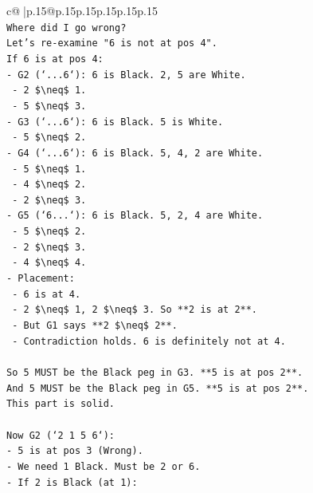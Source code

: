 \documentclass{article}
\begin{document}
{\begin{supertabular}{c@{$\;$}|p{.15\linewidth}@{}p{.15\linewidth}p{.15\linewidth}p{.15\linewidth}p{.15\linewidth}p{.15\linewidth}}
{{{\\ 
\texttt{Where did I go wrong?} \\
\texttt{Let's re{-}examine "6 is not at pos 4".} \\
\texttt{If 6 is at pos 4:} \\
\texttt{{-} G2 (`...6`): 6 is Black. 2, 5 are White.} \\
\texttt{  {-} 2 \$\textbackslash{}neq\$ 1.} \\
\texttt{  {-} 5 \$\textbackslash{}neq\$ 3.} \\
\texttt{{-} G3 (`...6`): 6 is Black. 5 is White.} \\
\texttt{  {-} 5 \$\textbackslash{}neq\$ 2.} \\
\texttt{{-} G4 (`...6`): 6 is Black. 5, 4, 2 are White.} \\
\texttt{  {-} 5 \$\textbackslash{}neq\$ 1.} \\
\texttt{  {-} 4 \$\textbackslash{}neq\$ 2.} \\
\texttt{  {-} 2 \$\textbackslash{}neq\$ 3.} \\
\texttt{{-} G5 (`6...`): 6 is Black. 5, 2, 4 are White.} \\
\texttt{  {-} 5 \$\textbackslash{}neq\$ 2.} \\
\texttt{  {-} 2 \$\textbackslash{}neq\$ 3.} \\
\texttt{  {-} 4 \$\textbackslash{}neq\$ 4.} \\
\texttt{{-} Placement:} \\
\texttt{  {-} 6 is at 4.} \\
\texttt{  {-} 2 \$\textbackslash{}neq\$ 1, 2 \$\textbackslash{}neq\$ 3. So **2 is at 2**.} \\
\texttt{  {-} But G1 says **2 \$\textbackslash{}neq\$ 2**.} \\
\texttt{  {-} Contradiction holds. 6 is definitely not at 4.} \\
\\ 
\texttt{So 5 MUST be the Black peg in G3. **5 is at pos 2**.} \\
\texttt{And 5 MUST be the Black peg in G5. **5 is at pos 2**.} \\
\texttt{This part is solid.} \\
\\ 
\texttt{Now G2 (`2 1 5 6`):} \\
\texttt{{-} 5 is at pos 3 (Wrong).} \\
\texttt{{-} We need 1 Black. Must be 2 or 6.} \\
\texttt{{-} If 2 is Black (at 1):} \\
}}}
\end{supertabular}}
\end{document}
